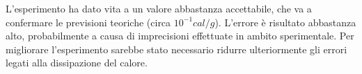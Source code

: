 L'esperimento ha dato vita a un valore abbastanza accettabile, che va a confermare le previsioni teoriche (circa $10^{-1}
 cal/g$). L'errore è risultato abbastanza alto, probabilmente a causa di imprecisioni effettuate in ambito sperimentale. Per migliorare
 l'esperimento sarebbe stato necessario ridurre ulteriormente gli errori legati alla dissipazione del calore. 
